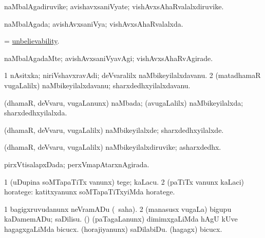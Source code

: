 \bentry
{} 
\gl{\nA}
\expl{}
\bmng
naMbalAgadiruvike; avishavxsaniVyate; vishAvxsAhaRvalalxdiruvike. 
\emng
\eentry

\bentry
{} 
\gl{\gu}
\expl{}
\bmng
naMbalAgada; avishAvxsaniVya; vishAvxsAhaRvalalxda. 
\emng
\eentry

\bentry
{} 
\gl{\nA}
\expl{}
\bmng
= \hyperlink{unbelievability}{unbelievability}. 
\emng
\eentry

\bentry
{} 
\gl{\kirxvi}
\expl{}
\bmng
naMbalAgadaMte; avishAvxsaniVyavAgi; vishAvxsAhaRvAgirade. 
\emng
\eentry

\bentry
{} 
\gl{\nA}
\expl{}
\bmng
\bnum
\num{1} nAsitxka; niriVshavxravAdi; deVvaralilx naMbikeyilalxdavanu. 
\num{2} (matadhamaR \mo vugaLalilx) naMbikeyilalxdavanu; sharxdedhxyilalxdavanu. 
\enum
\emng
\eentry

\bentry
{} 
\gl{\gu}
\expl{}
\bmng
(dhamaR, deVvaru, \mo vugaLanunx) naMbada; (avugaLalilx) naMbikeyilalxda; sharxdedhxyilalxda. 
\emng
\eentry

\bentry
{} 
\gl{\kirxvi}
\expl{}
\bmng
(dhamaR, deVvaru, \mo vugaLalilx) naMbikeyilalxde; sharxdedhxyilalxde. 
\emng
\eentry

\bentry
{} 
\gl{\nA}
\expl{}
\bmng
(dhamaR, deVvaru, \mo vugaLalilx) naMbikeyilalxdiruvike; asharxdedhx. 
\emng
\eentry

\bentry
{} 
\gl{\gu}
\expl{}
\bmng
pirxVtisalapxDada; perxVmapAtarxnAgirada. 
\emng
\eentry

\bentry
{} 
\gl{\sakirx}
\expl{}
\bmng
\bnum
\num{1} (uDupina soMTapaTiTx \mo vanunx) tege; kaLacu. 
\num{2} (paTiTx \mo vanunx kaLaci) horatege:  katitxyanunx soMTapaTiTxyiMda horatege. 
\enum
\emng
\eentry

\bentry
{} 
\gl{\kirx}


\noindent
\gl{\sakirx}
\expl{}
\bmng
\bnum
\num{1} bagigxruvudanunx neVramADu (\akirx\ saha). 
\num{2} (manasusx \mo vugaLa) bigupu kaDamemADu; saDilisu. 
 (\nw) 
\banum
{} (paTagaLanunx) dimimxgaLiMda hAgU kUve hagagxgaLiMda bicucx. 
 (horajiyanunx) saDilabiDu. 
 (hagagx) bicucx. 
\eanum
\numie
\enum
\emng

